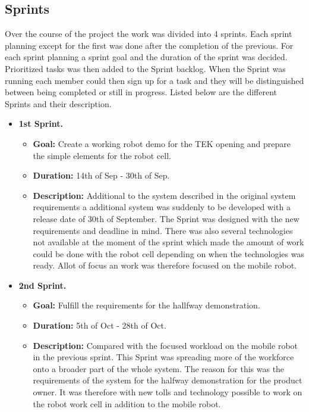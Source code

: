 \subsection{Sprints} \label{sec:sprints}
Over the course of the project the work was divided into 4 sprints. Each sprint planning except for the first was done after the completion of the previous. For each sprint planning a sprint goal and the duration of the sprint was decided. Prioritized tasks was then added to the Sprint backlog. When the Sprint was running each member could then sign up for a task and they will be distinguished between being completed or still in progress.
Listed below are the different Sprints and their description.
\begin{itemize}
    \item \textbf{1st Sprint.}
    \begin{itemize}
    	\item \textbf{Goal:} Create a working robot demo for the TEK opening and prepare the simple elements for the robot cell.
    	\item \textbf{Duration:} 14th of Sep - 30th of Sep.
    	\item \textbf{Description:} Additional to the system described in the original system requirements a additional system was suddenly to be developed with a release date of 30th of September. The Sprint was designed with the new requirements and deadline in mind. There was also several technologies not available at the moment of the sprint which made the amount of work could be done with the robot cell depending on when the technologies was ready. Allot of focus an work was therefore focused on the mobile robot.
	\end{itemize}
	
    \item \textbf{2nd Sprint.}
    \begin{itemize}
    	\item \textbf{Goal:} Fulfill the requirements for the hallfway demonstration.
    	\item \textbf{Duration:} 5th of Oct - 28th of Oct.
    	\item \textbf{Description:} Compared with the focused workload on the mobile robot in the previous sprint. This Sprint was spreading more of the workforce onto a broader part of the whole system. The reason for this was the requirements of the system for the halfway demonstration for the product owner. It was therefore with new tolls and technology possible to work on the robot work cell in addition to the mobile robot.
	\end{itemize}
	

\end{itemize}
